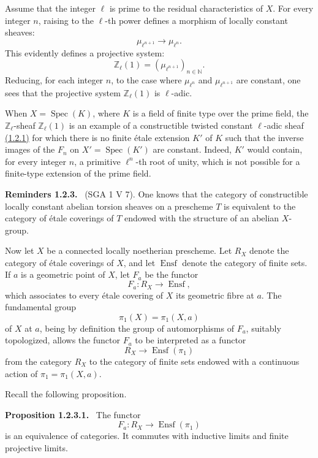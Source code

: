 \documentclass[11pt]{article}
\newenvironment{statement}[1]{\par\medskip\noindent\textbf{#1.}\ }{\par\medskip}
\DeclareMathOperator{\Spec}{Spec}
\providecommand{\Ensf}{\operatorname{Ensf}}
\providecommand{\Spec}{\operatorname{Spec}}
\providecommand{\Spec}{\operatorname{Spec}}
\providecommand{\Spec}{\operatorname{Spec}}
\providecommand{\Spec}{\operatorname{Spec}}
\begin{document}
Assume that the integer \(\ell\) is prime to the residual characteristics of \(X\). For every integer \(n\), raising to the \(\ell\)-th power defines a morphism of locally constant sheaves:
\[
\mu_{\ell^{n+1}}\longrightarrow \mu_{\ell^n}.
\]
This evidently defines a projective system:
\[
\mathbb Z_\ell(1)=(\mu_{\ell^{n+1}})_{n\in\mathbb N}.
\]
Reducing, for each integer \(n\), to the case where \(\mu_{\ell^n}\) and \(\mu_{\ell^{n+1}}\) are constant, one sees that the projective system \(\mathbb Z_\ell(1)\) is \(\ell\)-adic.

When \(X=\Spec(K)\), where \(K\) is a field of finite type over the prime field, the \(\mathbb Z_\ell\)-sheaf \(\mathbb Z_\ell(1)\) is an example of a constructible twisted constant \(\ell\)-adic sheaf \hyperref[sga5:VI:definition:1.2.1]{(1.2.1)} for which there is no finite étale extension \(K'\) of \(K\) such that the inverse images of the \(F_n\) on \(X'=\Spec(K')\) are constant. Indeed, \(K'\) would contain, for every integer \(n\), a primitive \(\ell^n\)-th root of unity, which is not possible for a finite-type extension of the prime field.

\label{sga5:VI:reminder:1.2.3}\begin{statement}{Reminders 1.2.3}
(SGA 1 V 7). One knows that the category of constructible locally constant abelian torsion sheaves on a prescheme \(T\) is equivalent to the category of étale coverings of \(T\) endowed with the structure of an abelian \(X\)-group.
\end{statement}

Now let \(X\) be a connected locally noetherian prescheme. Let \(R_X\) denote the category of étale coverings of \(X\), and let \(\Ensf\) denote the category of finite sets. If \(a\) is a geometric point of \(X\), let \(F_a\) be the functor
\[
F_a:R_X\longrightarrow \Ensf,
\]
which associates to every étale covering of \(X\) its geometric fibre at \(a\). The fundamental group
\[
\pi_1(X)=\pi_1(X,a)
\]
of \(X\) at \(a\), being by definition the group of automorphisms of \(F_a\), suitably topologized, allows the functor \(F_a\) to be interpreted as a functor
\[
R_X\longrightarrow \Ensf(\pi_1)
\]
from the category \(R_X\) to the category of finite sets endowed with a continuous action of \(\pi_1=\pi_1(X,a)\).

Recall the following proposition.

\label{sga5:VI:proposition:1.2.3.1}\begin{statement}{Proposition 1.2.3.1}
The functor
\[
F_a:R_X\longrightarrow \Ensf(\pi_1)
\]
is an equivalence of categories. It commutes with inductive limits and finite projective limits.
\end{statement}
\end{document}
